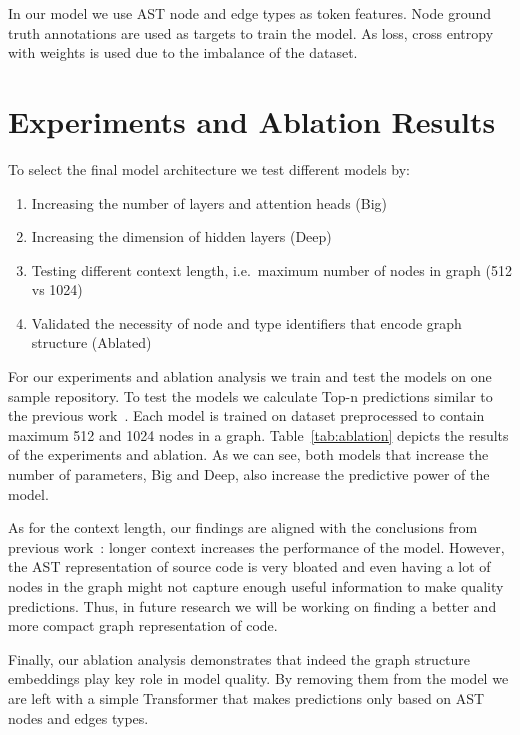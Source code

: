 \documentclass[conference]{IEEEtran}
\begin{document}
In our model we use AST node and edge types as token features.
Node ground truth annotations are used as targets to train the model.
As loss, cross entropy with weights is used due to the imbalance of the dataset.

\section{Experiments and Ablation Results}\label{sec:experiment-results-and-ablation}

To select the final model architecture we test different models by:

\begin{enumerate}
    \item Increasing the number of layers and attention heads (Big)
    \item Increasing the dimension of hidden layers (Deep)
    \item Testing different context length, i.e.\ maximum number of nodes in graph (512 vs 1024)
    \item Validated the necessity of node and type identifiers that encode graph structure (Ablated)
\end{enumerate}

For our experiments and ablation analysis we train and test the models on one sample repository.
To test the models we calculate Top-n predictions similar to the previous work~\cite{mir_type4py_2021}.
Each model is trained on dataset preprocessed to contain maximum 512 and 1024 nodes in a graph.
Table~\ref{tab:ablation} depicts the results of the experiments and ablation.
As we can see, both models that increase the number of parameters, Big and Deep, also increase the predictive power of the model.

As for the context length, our findings are aligned with the conclusions from previous work~\cite{arutyunov_big_2022}:
longer context increases the performance of the model.
However, the AST representation of source code is very bloated and even having a lot of nodes in the graph might not capture
enough useful information to make quality predictions.
Thus, in future research we will be working on finding a better and more compact graph representation of code.

Finally, our ablation analysis demonstrates that indeed the graph structure embeddings play key role in model quality.
By removing them from the model we are left with a simple Transformer that makes predictions only based on AST nodes and edges types.
\end{document}
